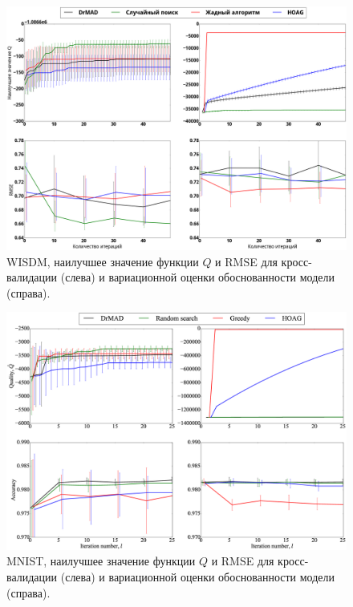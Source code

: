     \begin{figure}

    \includegraphics[width=\linewidth]{plots/hyperparams/wisdm.png}
\caption{WISDM,  наилучшее значение функции $Q$ и RMSE   для кросс-валидации (слева) и вариационной оценки обоснованности модели (справа).}    
\label{fig:wisdm}
    
    \end{figure}


    \begin{figure}

    \includegraphics[width=\linewidth]{plots/hyperparams/Fig_mnist.eps}

    \caption{MNIST, наилучшее значение функции $Q$ и RMSE   для кросс-валидации (слева) и вариационной оценки обоснованности модели (справа).}
    \label{fig:mnist}
    \end{figure}

